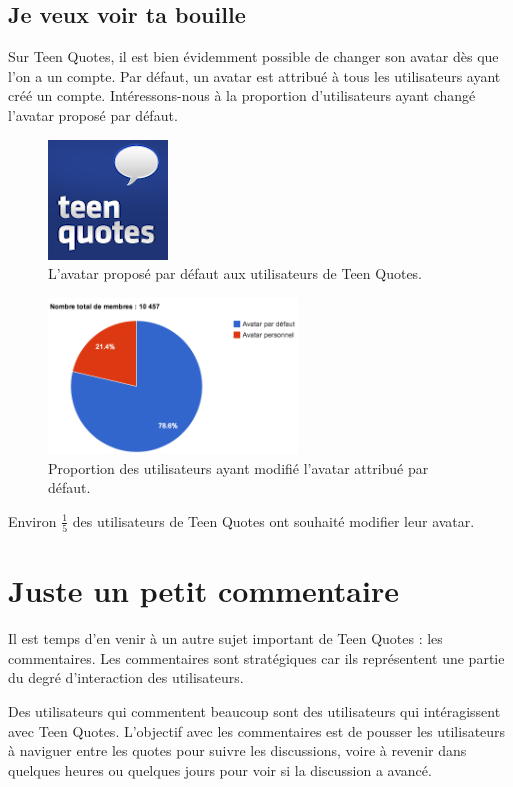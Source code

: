 \documentclass{report}
\begin{document}
	\section{Je veux voir ta bouille}
	Sur Teen Quotes, il est bien évidemment possible de changer son avatar dès que l'on a un compte. Par défaut, un avatar est attribué à tous les utilisateurs ayant créé un compte. Intéressons-nous à la proportion d'utilisateurs ayant changé l'avatar proposé par défaut.
	\begin{figure}[H]
		\center
		\includegraphics{images/avatarDefaut.png}
		\caption{L'avatar proposé par défaut aux utilisateurs de Teen Quotes.}
	\end{figure}

	\begin{figure}[H]
		\center
		\includegraphics[width=250px]{images/partAvatar.png}
		\caption{Proportion des utilisateurs ayant modifié l'avatar attribué par défaut.}
	\end{figure}
	Environ $\frac{1}{5}$ des utilisateurs de Teen Quotes ont souhaité modifier leur avatar.

	\chapter{Juste un petit commentaire}
	Il est temps d'en venir à un autre sujet important de Teen Quotes : les commentaires. Les commentaires sont stratégiques car ils représentent une partie du degré d'interaction des utilisateurs.

	Des utilisateurs qui commentent beaucoup sont des utilisateurs qui intéragissent avec Teen Quotes. L'objectif avec les commentaires est de pousser les utilisateurs à naviguer entre les quotes pour suivre les discussions, voire à revenir dans quelques heures ou quelques jours pour voir si la discussion a avancé.
\end{document}
